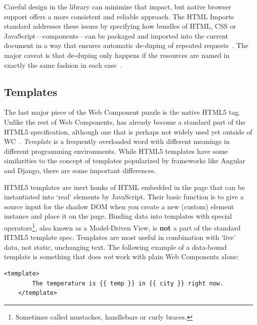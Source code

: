 Careful design in the library can minimize that impact, but native browser support offers a more consistent and reliable approach.
The HTML Imports standard addresses these issues by specifying how bundles of HTML, 
CSS or JavaScript---components---can be packaged and imported into the current document in a way that ensures automatic de-duping of repeated requests~\cite{w3ccontributors2015-a}.
The major caveat is that de-duping only happens if the resources are named in exactly the same fashion in each case~\cite{bidelman2013}.

\subsection{Templates}
The last major piece of the Web Component puzzle is the native HTML5  tag. 
Unlike the rest of Web Components,  has already become a standard part of the HTML5 specification, 
although one that is perhaps not widely used yet outside of WC~\cite{w3ccontributors2015-c}.
\textit{Template} is a frequently overloaded word with different meanings in different programming environments.
While HTML5 templates have some similarities to the concept of templates popularized by frameworks like Angular and Django, there are some important differences.

HTML5 templates are inert hunks of HTML embedded in the page that can be instantiated into `real' elements by JavaScript.
Their basic function is to give a source input for the shadow DOM when you create a new (custom) element instance and place it on the page.
Binding data into templates with special operators\footnote{Sometimes called mustaches, handlebars or curly braces. },
also known as a Model-Driven View,
is \textbf{not} a part of the standard HTML5 template spec.
Templates are most useful in combination with `live' data, not static, unchanging text.
The following example of a data-bound template is something that does \textit{not} work with plain Web Components alone:

\begin{lstlisting}[language=HTML5,caption={An example of a data-bound template.},label=l:dbtemplate]
	<template> 
		The temperature is {{ temp }} in {{ city }} right now.
	</template>
\end{lstlisting}

